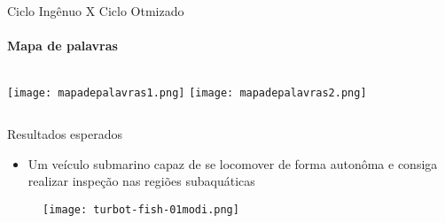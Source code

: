 \begin{frame}[t]{Ciclo Ingênuo X Ciclo Otmizado}
    \transboxout[duration=0.5]
    \framesubtitle{Mapa de palavras}
    
    \begin{columns}
        \newline  
            \texttt{[image: mapadepalavras1.png]}
        \newline  
         \texttt{[image: mapadepalavras2.png]}
    \end{columns}
    
\end{frame}
\begin{frame}[c]{Resultados esperados}
    \begin{itemize}
        \item Um veículo submarino capaz de se locomover de forma autonôma e consiga realizar inspeção 
        nas regiões subaquáticas
        
    \end{itemize}

    \begin{figure}
        \texttt{[image: turbot-fish-01modi.png]}
    \end{figure}
\end{frame}
\begin{frame}[c]{}
    \begin{center}
    \end{center}
\end{frame}
